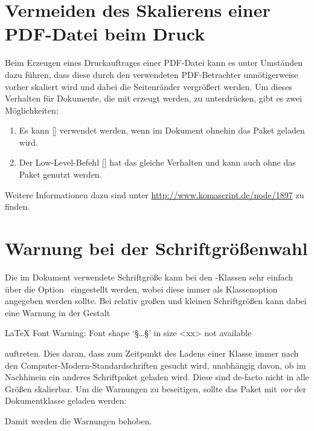 \section{Vermeiden des Skalierens einer PDF-Datei beim Druck}
%
Beim Erzeugen eines Druckauftrages einer PDF-Datei kann es unter Umständen dazu 
führen, dass diese durch den verwendeten PDF-Betrachter unnötigerweise vorher 
skaliert wird und dabei die Seitenränder vergrößert werden. Um dieses Verhalten 
für Dokumente, die mit  erzeugt werden, zu unterdrücken, gibt es 
zwei Möglichkeiten:
%
\begin{enumerate}
\item Es kann [] verwendet 
  werden, wenn im Dokument ohnehin das Paket  geladen wird.
\item Der Low-Level-Befehl
  []
  hat das gleiche Verhalten und kann auch ohne das Paket  
  genutzt werden.
\end{enumerate}
%
Weitere Informationen dazu sind unter \url{http://www.komascript.de/node/1897} 
zu finden.


\section{Warnung bei der Schriftgrößenwahl}
%
%
Die im Dokument verwendete Schriftgröße kann bei den \KOMAScript-Klassen sehr 
einfach über die Option~ eingestellt werden, wobei diese immer 
als Klassenoption angegeben werden sollte. Bei relativ großen und kleinen 
Schriftgrößen kann dabei eine Warnung in der Gestalt 
%
\begin{quoting}
\begin{Code}[escapechar=§]
LaTeX Font Warning: Font shape `§\dots§' in size <xx> not available
\end{Code}
\end{quoting}
%
auftreten. Dies daran, dass zum Zeitpunkt des Ladens einer Klasse immer nach 
den Computer-Modern-Standardschriften gesucht wird, unabhängig davon, ob im 
Nachhinein ein anderes Schriftpaket geladen wird. Diese sind de-facto nicht in 
alle Größen skalierbar. Um die Warnungen zu beseitigen, sollte das Paket 
 mit  \emph{vor} der Dokumentklasse 
geladen werden: 
\begin{quoting}[rightmargin=0pt]
\end{quoting}
%
Damit werden die Warnungen behoben.


